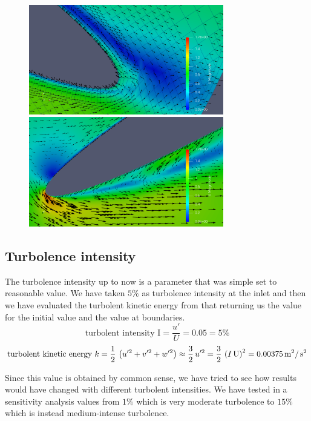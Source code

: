 \documentclass[a4paper,12pt]{article}
\begin{document}
\begin{figure}
\includegraphics[width=8.5cm]{images/turbulence/recirculation_scalarScaledMESH.png}
\includegraphics[width=8.5cm]{images/turbulence/recirculation_vectorScaled.png}  
\end{figure}





\subsection{Turbolence intensity}
The turbolence intensity up to now is a parameter that was simple set to reasonable value. We have taken $5\%$ as turbolence intensity at the inlet and then we have evaluated the turbolent kinetic energy from that returning us the value for the initial value and the value at boundaries.
\begin{equation}
\label{eq:turbolent_I}
\text{turbolent intensity } \text{I} = \dfrac{u'}{U} = 0.05 = 5\%
\end{equation}
\begin{equation}
\text{turbolent kinetic energy } k = \dfrac{1}{2} \, \left( u'^2+v'^2+w'^2 \right) \approx \dfrac{3}{2} \, u'^2 = \dfrac{3}{2} \, \left(I\, \text{U} \right) ^2 = 0.00375 \,\text{m}^2 / \,\text{s}^2
\label{eq:turbolent_k}
\end{equation}

Since this value is obtained by common sense, we have tried to see how results would have changed with different turbolent intensities.
We have tested in a sensitivity analysis values from $1\%$ which is very moderate turbolence to $15\%$ which is instead medium-intense turbolence.
\end{document}
